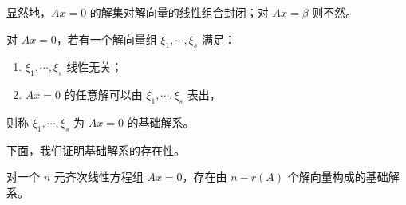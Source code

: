 显然地，$Ax=0$ 的解集对解向量的线性组合封闭；对 $Ax=\beta$ 则不然。

\begin{definition}\label{p1:concept:c2-l1151}
	对 $Ax=0$，若有一个解向量组 $\xi_1,\cdots,\xi_s$ 满足：
	\begin{enumerate}
		\item $\xi_1,\cdots,\xi_s$ 线性无关；
		\item $Ax=0$ 的任意解可以由 $\xi_1,\cdots,\xi_s$ 表出，
	\end{enumerate}
	则称 $\xi_1,\cdots,\xi_s$ 为 $Ax=0$ 的基础解系。
\end{definition}

下面，我们证明基础解系的存在性。

\begin{theorem}
	对一个 $n$ 元齐次线性方程组 $Ax=0$，存在由 $n-r(A)$ 个解向量构成的基础解系。
\end{theorem}
